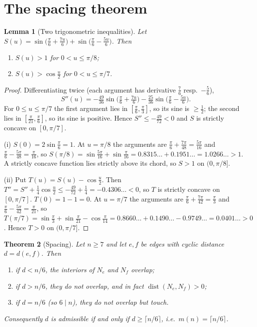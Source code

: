 \documentclass[11pt,a4paper]{article}
\newtheorem{theorem}{Theorem}[section]
\newtheorem{lemma}[theorem]{Lemma}
\theoremstyle{definition}
\theoremstyle{remark}
\DeclareMathOperator{\dist}{dist}
\begin{document}
\section{The spacing theorem}\label{sec:spacing}

\begin{lemma}[Two trigonometric inequalities]\label{lem:trig}
Let $S(u)=\sin\!\big(\tfrac\pi6+\tfrac{7u}{6}\big)+\sin\!\big(\tfrac\pi6-\tfrac{5u}{6}\big)$. Then
\begin{enumerate}[label=(\roman*),nosep]
\item $S(u)>1$ for $0<u\le\pi/8$;
\item $S(u)>\cos\tfrac u2$ for $0<u\le\pi/7$.
\end{enumerate}
\end{lemma}
\begin{proof}
Differentiating twice (each argument has derivative $\frac76$ resp.\ $-\frac56$),
\[
S''(u)=-\tfrac{49}{36}\sin\!\big(\tfrac\pi6+\tfrac{7u}6\big)-\tfrac{25}{36}\sin\!\big(\tfrac\pi6-\tfrac{5u}6\big).
\]
For $0\le u\le\pi/7$ the first argument lies in $[\tfrac\pi6,\tfrac\pi3]$, so its sine is $\ge\frac12$; the second lies in $[\tfrac\pi{21},\tfrac\pi6]$, so its sine is positive. Hence $S''\le-\tfrac{49}{72}<0$ and $S$ is strictly concave on $[0,\pi/7]$.

(i) $S(0)=2\sin\frac\pi6=1$. At $u=\pi/8$ the arguments are $\tfrac\pi6+\tfrac{7\pi}{48}=\tfrac{5\pi}{16}$ and $\tfrac\pi6-\tfrac{5\pi}{48}=\tfrac{\pi}{16}$, so $S(\pi/8)=\sin\tfrac{5\pi}{16}+\sin\tfrac\pi{16}=0.8315\ldots+0.1951\ldots=1.0266\ldots>1$.
A strictly concave function lies strictly above its chord, so $S>1$ on $(0,\pi/8]$.

(ii) Put $T(u)=S(u)-\cos\tfrac u2$. Then $T''=S''+\tfrac14\cos\tfrac u2\le-\tfrac{49}{72}+\tfrac14=-0.4306\ldots<0$, so $T$ is strictly concave on $[0,\pi/7]$. $T(0)=1-1=0$. At $u=\pi/7$ the arguments are $\tfrac\pi6+\tfrac{7\pi}{42}=\tfrac\pi3$ and $\tfrac\pi6-\tfrac{5\pi}{42}=\tfrac\pi{21}$, so
$T(\pi/7)=\sin\tfrac\pi3+\sin\tfrac\pi{21}-\cos\tfrac\pi{14}=0.8660\ldots+0.1490\ldots-0.9749\ldots=0.0401\ldots>0$. Hence $T>0$ on $(0,\pi/7]$.
\end{proof}

\begin{theorem}[Spacing]\label{thm:spacing}
Let $n\ge7$ and let $e,f$ be edges with cyclic distance $d=d(e,f)$. Then
\begin{enumerate}[label=(\alph*),nosep]
\item if $d<n/6$, the interiors of $N_e$ and $N_f$ overlap;
\item if $d>n/6$, they do not overlap, and in fact $\dist(N_e,N_f)>0$;
\item if $d=n/6$ (so $6\mid n$), they do not overlap but touch.
\end{enumerate}
Consequently $d$ is admissible if and only if $d\ge\lceil n/6\rceil$, i.e.\ $m(n)=\lceil n/6\rceil$.
\end{theorem}
\end{document}
